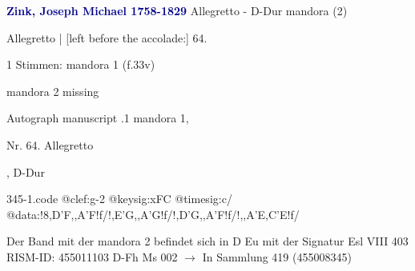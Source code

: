 \documentclass[twocolumn]{book}
\begin{document}
\newline \par \vspace{7pt} \textcolor{darkblue}{\textbf{Zink, Joseph Michael  1758-1829}}
\newline Allegretto - D-Dur
\newline mandora (2)
\newline \begin{itshape}[f.33v, at left:] Allegretto | [left before the accolade:] 64.\end{itshape} 
\newline \textcolor{darkblue}{}  1 Stimmen: mandora 1  (f.33v)
\newline \begin{small} mandora 2 missing\end{small} 
\newline Autograph manuscript
.1  mandora 1, \begin{itshape}Nr. 64. Allegretto\end{itshape}, D-Dur  
\begin{filecontents*}{345-1.code}
@clef:g-2
@keysig:xFC
@timesig:c/
@data:!{8,D'F,,A'F}!f/!{,E'G,,A'G}!f/!{,D'G,,A'F}!f/!{,,A'E,C'E}!f/
\end{filecontents*}
\newline
%
\newline Der Band mit der mandora 2 befindet sich in D Eu mit der Signatur Esl VIII 403
\newline RISM-ID: 455011103
\newline D-Fh  Ms 002
\newline $\rightarrow$ In Sammlung 419 (455008345)
      
\end{document}
